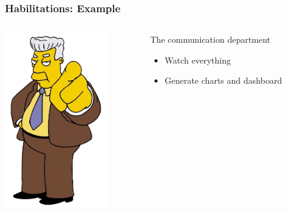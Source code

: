 \documentclass{beamer}
\begin{document}
\begin{frame}
\frametitle{Habilitations: Example}
\begin{columns}
 \begin{column}{0.45\textwidth}
         \includegraphics[height=7.5cm]{./pics/simpsons/comm_kent_brockman.png}
 \end{column}
 \begin{column}{0.45\textwidth}
    \begin{block}{The communication department}
        \begin{itemize}
            \item Watch everything
            \item Generate charts and dashboard 
        \end{itemize}
    \end{block}
 \end{column}
\end{columns}
\end{frame}
\end{document}

